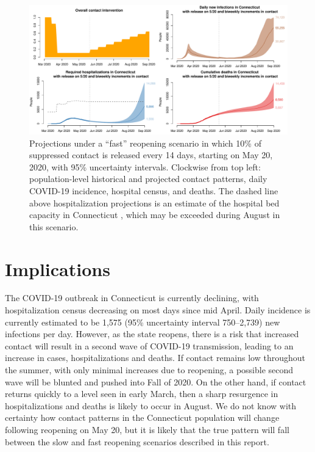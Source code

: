 \documentclass[11pt]{article}
\begin{document}
\begin{figure}
\centering
\includegraphics[width=\textwidth]{figures/fast.pdf}
\caption{Projections under a ``fast'' reopening scenario in which 10\% of suppressed contact is released every 14 days, starting on May 20, 2020, with 95\% uncertainty intervals.  Clockwise from top left: population-level historical and projected contact patterns, daily COVID-19 incidence, hospital census, and deaths. The dashed line above hospitalization projections is an estimate of the hospital bed capacity in Connecticut \citep{CHAwebsite}, which may be exceeded during August in this scenario. }
\label{fig:fast}
\end{figure}




\section*{Implications}

The COVID-19 outbreak in Connecticut is currently declining, with hospitalization census decreasing on most days since mid April.  Daily incidence is currently estimated to be 1,575 (95\% uncertainty interval 750--2,739) new infections per day.  However, as the state reopens, there is a risk that increased contact will result in a second wave of COVID-19 transmission, leading to an increase in cases, hospitalizations and deaths. If contact remains low throughout the summer, with only minimal increases due to reopening, a possible second wave will be blunted and pushed into Fall of 2020.  On the other hand, if contact returns quickly to a level seen in early March, then a sharp resurgence in hospitalizations and deaths is likely to occur in August.  We do not know with certainty how contact patterns in the Connecticut population will change following reopening on May 20, but it is likely that the true pattern will fall between the slow and fast reopening scenarios described in this report.  
\end{document}
